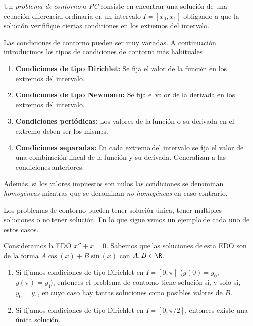 \documentclass{article}
\begin{document}
\begin{definition}
  Un \emph{problema de contorno} o \emph{PC} consiste en encontrar una solución de una ecuación
  diferencial ordinaria en un intervalo $I = [x_0, x_1]$ obligando a que la solución verififique
  ciertas condiciones en los extremos del intervalo.
\end{definition}

Las condiciones de contorno pueden ser muy variadas. A continuación introducimos los tipos de
condiciones de contorno más habituales.

\begin{enumerate}
\item \textbf{Condiciones de tipo Dirichlet:} Se fija el valor de la función en los extremos del
  intervalo.
\item \textbf{Condiciones de tipo Newmann:} Se fija el valor de la derivada en los extremos del
  intervalo.
\item \textbf{Condiciones periódicas:} Los valores de la función o su derivada en el extremo deben
  ser los mismos.
\item \textbf{Condiciones separadas:} En cada extremo del intervalo se fija el valor de una
  combinación lineal de la función y su derivada. Generalizan a las condiciones anteriores.
\end{enumerate}

Además, si los valores impuestos son nulos las condiciones se denominan \emph{homogéneas} mientras
que se denominan \emph{no homogéneas} en caso contrario.

Los problemas de contorno pueden tener solución única, tener múltiples soluciones o no tener
solución. En lo que sigue vemos un ejemplo de cada uno de estos casos.

\begin{ex} \label{ex:contorno} Consideramos la EDO $x'' + x = 0$. Sabemos que las soluciones de esta
  EDO son de la forma $A \cos(x) + B \sin(x)$ con $A,B \in \R$.
  
  \begin{enumerate}
  \item Si fijamos condiciones de tipo Dirichlet en $I = [0,\pi]$ ($y(0) = y_0$, $y(\pi) = y_1$),
    entonces el problema de contorno tiene solución si, y solo si, $y_0 = y_1$, en cuyo caso hay
    tantas soluciones como posibles valores de $B$.
  \item Si fijamos condiciones de tipo Dirichlet en $I = [0, \pi / 2]$, entonces existe una única
    solución. \qedhere
  \end{enumerate}
\end{ex}
\end{document}
